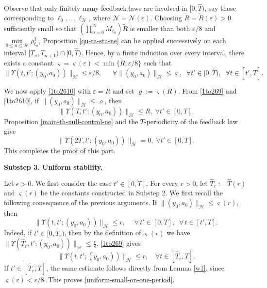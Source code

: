 \documentclass[a4paper]{article}
\numberwithin{equation}{section}
\begin{document}
\begin{appendices}
Observe that only finitely many feedback laws are involved in $[0,\hat T)$, say those corresponding to $\ell_0,\ldots,\ell_{\mathcal N}$, where ${\mathcal N}={\mathcal N}(\varepsilon)$. Choosing $\tilde R=\tilde R(\varepsilon)>0$ sufficiently small so that $ \left(\prod_{n=0}^{\mathcal N}M_{\ell_n}\right)\tilde R$ is smaller than both $\varepsilon/8$ and $\min\limits_{0\leq n\leq\mathcal N}\rho_{\ell_n}^3$, Proposition \ref{qu-ra-sta-ne} can be applied successively on each interval $[T_n,T_{n+1})\cap[0,\hat T)$. Hence, by a finite induction over every interval, there exists a constant $\varsigma=\varsigma(\varepsilon)<\min\{\tilde R,\varepsilon/8\}$ such that
\begin{equation}\label{1to2610}\|\Upsilon(t,t';(y_0,a_0))\|_{\mathcal H}\leq \varepsilon/8,
\quad\;\;\forall \|(y_0,a_0)\|_{\mathcal H}\leq \varsigma,\;\;\forall t'\in[0,\hat T),\;\;\forall t\in[t',\hat T].\end{equation}

We now apply \eqref{1to2610} with $\varepsilon=R$ and set $\varrho:=\varsigma(R)$. From \eqref{1to269} and \eqref{1to2610}, if $\|(y_0,a_0)\|_{\mathcal{H}}\le \varrho$, then 
$$\|\Upsilon(T,t';(y_0,a_0))\|_{\mathcal{H}}\le R,\;\forall t'\in [0,T].$$
Proposition \ref{main-th-null-control-ne} and the $T$-periodicity of the feedback law give
$$\|\Upsilon(2T,t';(y_0,a_0))\|_{\mathcal{H}}=0,\;\forall t'\in [0,T].$$
This completes the proof of this part.

\noindent \textbf{Substep 3. Uniform stability.}

Let $\epsilon>0$. We first consider the case $t'\in[0,T]$. For every $r>0$, let $\hat T_r:=\hat T(r)$ and $\varsigma(r)$ be the constants constructed in Substep 2. We first recall the following consequence of the previous arguments. 
If $\|(y_0,a_0)\|_{\mathcal H}\le \varsigma(r)$, then
\begin{equation}\label{uniform-small-on-one-period}
\|\Upsilon(t,t';(y_0,a_0))\|_{\mathcal H}\le r,
\quad \;\forall\, t'\in[0,T],\;\; \forall\, t\in[t',T].
\end{equation}
Indeed, if $t'\in[0,\hat T_r)$, then by the definition of $\varsigma(r)$ we have $\|\Upsilon(\hat T_r,t';(y_0,a_0))\|_{\mathcal H}\le \frac r8$. \eqref{1to269} gives
$$\|\Upsilon(t,t';(y_0,a_0))\|_{\mathcal H}\le r,
\quad \forall t\in[\hat T_r,T].$$
If $t'\in[\hat T_r,T]$, the same estimate follows directly from Lemma \ref{w1}, since
$\varsigma(r)<r/8$. This proves \eqref{uniform-small-on-one-period}.


\end{appendices}
\end{document}
